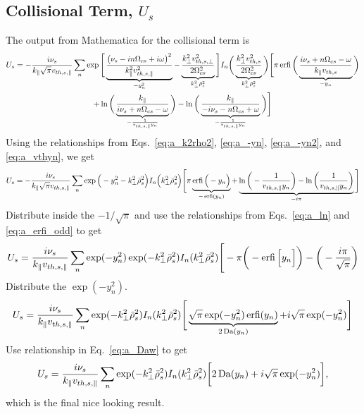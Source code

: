 \subsection{Collisional Term, $U_s$}
The output from Mathematica for the collisional term is
\begin{multline}
	U_s = -\frac{i \nu_s}{k_\parallel \sqrt{\pi}v_{th,s,\parallel}} \sum_n
	\exp \Bigg[ \underbrace{\frac{\big( \nu_s - i n\Omega_{cs} + i \omega \big)^2}{k_\parallel^2 v_{th,s,\parallel}^2}}_{-y_n^2}
	- \underbrace{\frac{k_\perp^2 v_{th,s,\perp}^2}{2 \Omega_{cs}^2}}_{k_\perp^2 \bar{\rho}_s^2} \Bigg]
	I_n \bigg( \underbrace{\frac{k_\perp^2 v_{th,s}^2}{2\Omega_{cs}^2}}_{k_\perp^2 \bar{\rho}_s^2}\bigg)
	\Bigg[\pi \operatorname{erfi} \bigg( \underbrace{\frac{i\nu_s + n\Omega_{cs} - \omega}{k_\parallel v_{th,s}}}_{-y_n}  \bigg)   \\
	+ \ln \bigg( \underbrace{\frac{k_\parallel}{i\nu_s + n\Omega_{cs} - \omega} }_{-\frac{1}{v_{th,s,\parallel}y_n}}\bigg)
	- \ln \bigg( \underbrace{\frac{k_\parallel}{-i\nu_s - n\Omega_{cs} + \omega}}_{-\frac{1}{v_{th,s,\parallel}y_n}} \bigg) 
	\Bigg]
\end{multline}
Using the relationships from Eqs.~\ref{eq:a_k2rho2}, \ref{eq:a_-yn}, \ref{eq:a_-yn2}, and \ref{eq:a_vthyn}, we get
\begin{equation}
	U_s = -\frac{i \nu_s}{k_\parallel \sqrt{\pi} v_{th,s,\parallel}} \sum_n
	\exp \Big(-y_n^2 - k_\perp^2 \bar{\rho}_s^2 \Big)
	 I_n \Big( k_\perp^2 \bar{\rho}_s^2 \Big)	
	\Bigg[ \pi \underbrace{\operatorname{erfi}\Big(-y_n\Big)}_{-\operatorname{erfi}(y_n)}
	+\underbrace{ \ln\bigg( -\frac{1}{v_{th,s,\parallel} y_n} \bigg)
	-\ln\bigg( \frac{1}{v_{th,s,\parallel} y_n} \bigg)}_{-i\pi}
	\Bigg]
\end{equation}
Distribute inside the $-1/\sqrt{\pi}$ and use the relationships
from Eqs.~\ref{eq:a_ln} and \ref{eq:a_erfi_odd} to get
\begin{equation}
	U_s = \frac{i\nu_s}{k_\parallel v_{th,s,\parallel}} \sum_n
	\exp(-y_n^2)
	\exp(-k_\perp^2 \bar{\rho}_s^2)
	 I_n (k_\perp^2 \bar{\rho}_s^2) 
	\Bigg[ - \pi \bigg(-\operatorname{erfi}\Big[y_n\Big]\bigg) - 
	\bigg(- \frac{i\pi}{\sqrt{\pi}} \bigg)
\end{equation}
Distribute the $\exp(-y_n^2)$.
\begin{equation}
	U_s = \frac{i \nu_s}{k_\parallel v_{th,s,\parallel}} \sum_n
	\exp(-k_\perp^2 \bar{\rho}_s^2)
	 I_n (k_\perp^2 \bar{\rho}_s^2)
	\Bigg[ \underbrace{\sqrt{\pi} \exp(-y_n^2) \operatorname{erfi}(y_n)}_{2\operatorname{Da}(y_n)} + i \sqrt{\pi} \exp(-y_n^2) \Bigg]
\end{equation}
Use relationship in Eq.~\ref{eq:a_Daw} to get
\begin{equation}
	U_s = \frac{i \nu_s}{k_\parallel v_{th,s,\parallel}} \sum_n
	\exp(-k_\perp^2 \bar{\rho}_s^2)
	 I_n (k_\perp^2 \bar{\rho}_s^2)
	\bigg[ 2\operatorname{Da}(y_n) + i \sqrt{\pi} \exp(-y_n^2)  \bigg],
\end{equation}
which is the final nice looking result.


